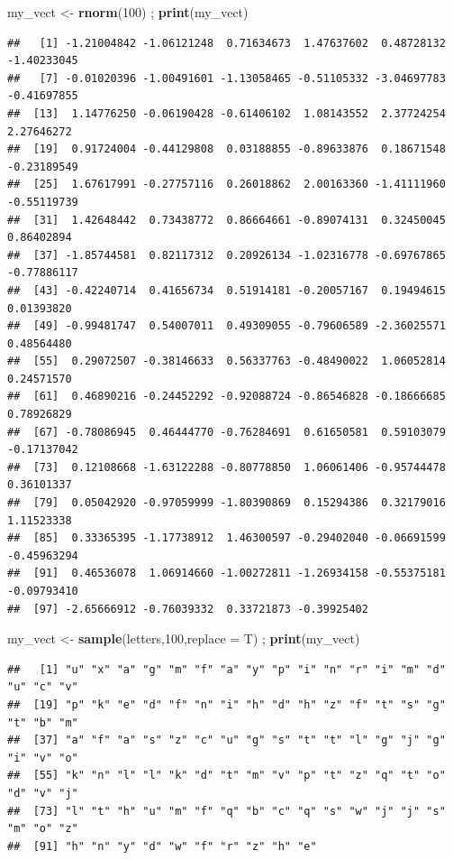 \documentclass[
]{book}
\newenvironment{Shaded}{\begin{snugshade}}{\end{snugshade}}
\newcommand{\DataTypeTok}[1]{\textcolor[rgb]{0.13,0.29,0.53}{#1}}
\newcommand{\DecValTok}[1]{\textcolor[rgb]{0.00,0.00,0.81}{#1}}
\newcommand{\KeywordTok}[1]{\textcolor[rgb]{0.13,0.29,0.53}{\textbf{#1}}}
\newcommand{\NormalTok}[1]{#1}
\newcommand{\StringTok}[1]{\textcolor[rgb]{0.31,0.60,0.02}{#1}}
\begin{document}
\begin{Shaded}
\begin{Highlighting}[]
\NormalTok{my_vect <-}\StringTok{ }\KeywordTok{rnorm}\NormalTok{(}\DecValTok{100}\NormalTok{) ; }\KeywordTok{print}\NormalTok{(my_vect)}
\end{Highlighting}
\end{Shaded}

\begin{verbatim}
##   [1] -1.21004842 -1.06121248  0.71634673  1.47637602  0.48728132 -1.40233045
##   [7] -0.01020396 -1.00491601 -1.13058465 -0.51105332 -3.04697783 -0.41697855
##  [13]  1.14776250 -0.06190428 -0.61406102  1.08143552  2.37724254  2.27646272
##  [19]  0.91724004 -0.44129808  0.03188855 -0.89633876  0.18671548 -0.23189549
##  [25]  1.67617991 -0.27757116  0.26018862  2.00163360 -1.41111960 -0.55119739
##  [31]  1.42648442  0.73438772  0.86664661 -0.89074131  0.32450045  0.86402894
##  [37] -1.85744581  0.82117312  0.20926134 -1.02316778 -0.69767865 -0.77886117
##  [43] -0.42240714  0.41656734  0.51914181 -0.20057167  0.19494615  0.01393820
##  [49] -0.99481747  0.54007011  0.49309055 -0.79606589 -2.36025571  0.48564480
##  [55]  0.29072507 -0.38146633  0.56337763 -0.48490022  1.06052814  0.24571570
##  [61]  0.46890216 -0.24452292 -0.92088724 -0.86546828 -0.18666685  0.78926829
##  [67] -0.78086945  0.46444770 -0.76284691  0.61650581  0.59103079 -0.17137042
##  [73]  0.12108668 -1.63122288 -0.80778850  1.06061406 -0.95744478  0.36101337
##  [79]  0.05042920 -0.97059999 -1.80390869  0.15294386  0.32179016  1.11523338
##  [85]  0.33365395 -1.17738912  1.46300597 -0.29402040 -0.06691599 -0.45963294
##  [91]  0.46536078  1.06914660 -1.00272811 -1.26934158 -0.55375181 -0.09793410
##  [97] -2.65666912 -0.76039332  0.33721873 -0.39925402
\end{verbatim}

\begin{Shaded}
\begin{Highlighting}[]
\NormalTok{my_vect <-}\StringTok{ }\KeywordTok{sample}\NormalTok{(letters,}\DecValTok{100}\NormalTok{,}\DataTypeTok{replace =}\NormalTok{ T) ; }\KeywordTok{print}\NormalTok{(my_vect)}
\end{Highlighting}
\end{Shaded}

\begin{verbatim}
##   [1] "u" "x" "a" "g" "m" "f" "a" "y" "p" "i" "n" "r" "i" "m" "d" "u" "c" "v"
##  [19] "p" "k" "e" "d" "f" "n" "i" "h" "d" "h" "z" "f" "t" "s" "g" "t" "b" "m"
##  [37] "a" "f" "a" "s" "z" "c" "u" "g" "s" "t" "t" "l" "g" "j" "g" "i" "v" "o"
##  [55] "k" "n" "l" "l" "k" "d" "t" "m" "v" "p" "t" "z" "q" "t" "o" "d" "v" "j"
##  [73] "l" "t" "h" "u" "m" "f" "q" "b" "c" "q" "s" "w" "j" "j" "s" "m" "o" "z"
##  [91] "h" "n" "y" "d" "w" "f" "r" "z" "h" "e"
\end{verbatim}
\end{document}

